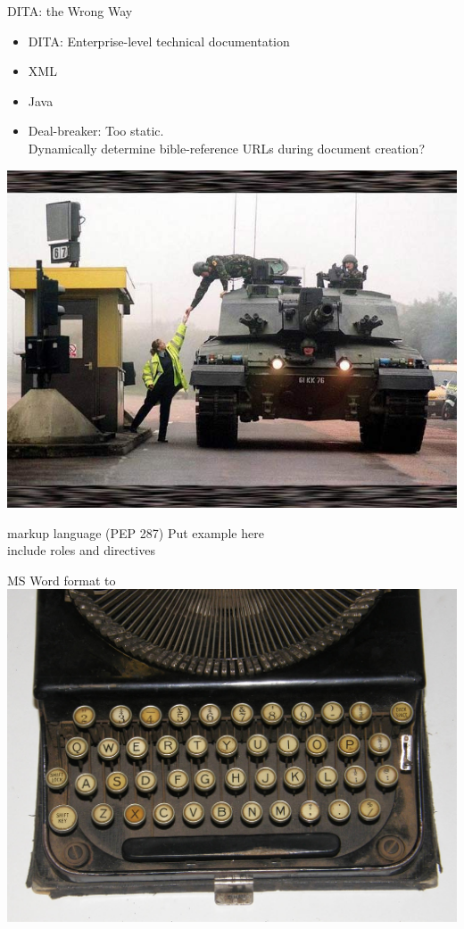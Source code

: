 \documentclass{beamer}
\begin{document}
    \begin{frame}{DITA: the Wrong Way}
        \begin{itemize}
        \item DITA: Enterprise-level technical documentation
        \item XML
        \item Java
        \item Deal-breaker: Too static.\\
            Dynamically determine bible-reference URLs during document creation?
        \end{itemize}
    \end{frame}
    
    \begin{frame}[plain]
        \includegraphics[keepaspectratio=true, width=\paperwidth]{tank-toll.jpg}
    \end{frame}
    
    \begin{frame}{\rst markup language (PEP 287)}
        Put example here\\
        include roles and directives
    \end{frame}

    \begin{frame}{MS Word format to \rst}
        \includegraphics[keepaspectratio=true, width=\paperwidth]{typewriter_keyboard.jpg}
    \end{frame}
    
\end{document}
